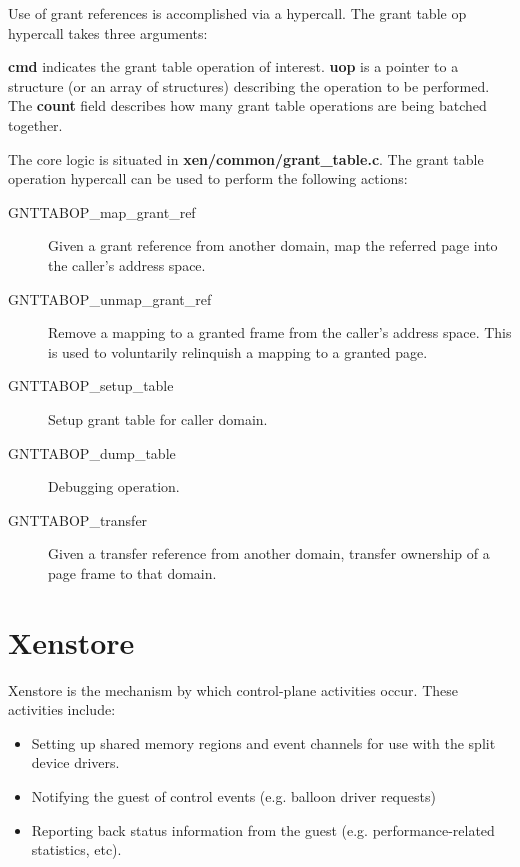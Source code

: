 \documentclass[11pt,twoside,final,openright,a4paper]{report}
\newcommand{\hypercall}[1]{\vspace{2mm}{\sf #1}}
\begin{document}
Use of grant references is accomplished via a hypercall.  The grant
table op hypercall takes three arguments:

\hypercall{grant\_table\_op(unsigned int cmd, void *uop, unsigned int count)}

{\bf cmd} indicates the grant table operation of interest.  {\bf uop}
is a pointer to a structure (or an array of structures) describing the
operation to be performed.  The {\bf count} field describes how many
grant table operations are being batched together.

The core logic is situated in {\bf xen/common/grant\_table.c}.  The
grant table operation hypercall can be used to perform the following
actions:

\begin{description}
\item[GNTTABOP\_map\_grant\_ref] Given a grant reference from another
  domain, map the referred page into the caller's address space.
\item[GNTTABOP\_unmap\_grant\_ref] Remove a mapping to a granted frame
  from the caller's address space.  This is used to voluntarily
  relinquish a mapping to a granted page.
\item[GNTTABOP\_setup\_table] Setup grant table for caller domain.
\item[GNTTABOP\_dump\_table] Debugging operation.
\item[GNTTABOP\_transfer] Given a transfer reference from another
  domain, transfer ownership of a page frame to that domain.
\end{description}


\chapter{Xenstore}

Xenstore is the mechanism by which control-plane activities occur.
These activities include:

\begin{itemize}
\item Setting up shared memory regions and event channels for use with
  the split device drivers.
\item Notifying the guest of control events (e.g. balloon driver
  requests)
\item Reporting back status information from the guest
  (e.g. performance-related statistics, etc).
\end{itemize}
\end{document}
